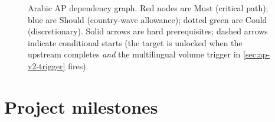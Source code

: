 \documentclass[11pt,a4paper,twoside]{report}
\begin{document}
\begin{figure}[htbp]
\caption{Arabic AP dependency graph. Red nodes are Must (critical
path); blue are Should (country-wave allowance); dotted green are
Could (discretionary). Solid arrows are hard prerequisites; dashed
arrows indicate conditional starts (the target is unlocked when the
upstream completes \emph{and} the multilingual volume trigger in
\cref{sec:ap-v2-trigger} fires).}
\label{fig:ap-dependency-graph}
\end{figure}

\section{Project milestones}\label{sec:ap-milestones}
\end{document}
